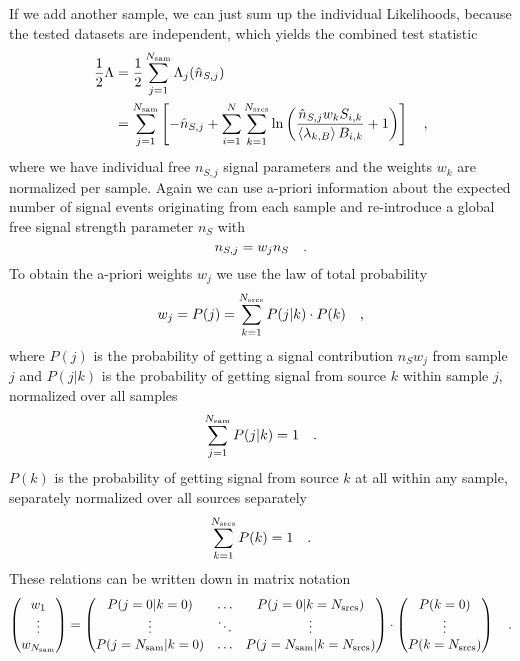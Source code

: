 If we add another sample, we can just sum up the individual Likelihoods, because the tested datasets are independent, which yields the combined test statistic
\begin{align}
  \frac{1}{2}\Lambda
  &= \frac{1}{2} \sum_{j=1}^{N_\text{sam}} \Lambda_j(\hat{n}_{S,j}) \\
  &= \sum_{j=1}^{N_\text{sam}} \left[ -\hat{n}_{S,j} +
    \sum_{i=1}^N \sum_{k=1}^{N_\text{srcs}} \ln\left(
      \frac{\hat{n}_{S,j} w_k S_{i,k}}{\Braket{\lambda_{k,B}} B_{i,k}}
      + 1 \right) \right]\quad\text{,} \\
\end{align}
where we have individual free $n_{S,j}$ signal parameters and the weights $w_k$ are normalized per sample.
Again we can use a-priori information about the expected number of signal events originating from each sample and re-introduce a global free signal strength parameter $n_S$ with
\begin{equation}
  n_{S,j} = w_j n_S \quad\text{.}
\end{equation}
To obtain the a-priori weights $w_j$ we use the law of total probability 
\begin{equation}
  w_j = P(j) = \sum_{k=1}^{N_\text{srcs}} P(j|k)\cdot P(k) \quad\text{,}
\end{equation}
where $P(j)$ is the probability of getting a signal contribution $n_S w_j$ from sample $j$ and $P(j|k)$ is the probability of getting signal from source $k$ within sample $j$, normalized over all samples
\begin{equation}
  \sum_{j=1}^{N_\text{sam}} P(j|k) = 1 \quad\text{.}
\end{equation}
$P(k)$ is the probability of getting signal from source $k$ at all within any sample, separately normalized over all sources separately
\begin{equation}
  \sum_{k=1}^{N_\text{srcs}} P(k) = 1 \quad\text{.}
\end{equation}
These relations can be written down in matrix notation
\begin{equation}
  \begin{pmatrix} w_1 \\ \vdots \\ w_{N_\text{sam}} \end{pmatrix} =
    \begin{pmatrix}
      P(j=0|k=0) & \dots & P(j=0|k=N_\text{srcs}) \\
      \vdots & \ddots & \vdots \\
      P(j=N_\text{sam}|k=0) & \dots & P(j=N_\text{sam}|k=N_\text{srcs})
    \end{pmatrix} \cdot
    \begin{pmatrix}
      P(k=0) \\ \vdots \\ P(k=N_\text{srcs})
    \end{pmatrix} \quad\text{.}
\end{equation}

